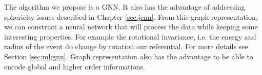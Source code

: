\documentclass[../main.tex]{subfiles}
\begin{document}
The algorithm we propose is a GNN. It also has the advantage of addressing sphericity issues described in Chapter \ref{sec:jcnn}.
From this graph representation, we can construct a neural network that will process the data while keeping some interesting properties. For example the rotational invariance, i.e. the energy and radius of the event do change by rotation our referential. For more details see Section \ref{sec:ml:gnn}. Graph representation also has the advantage to be able to encode global and higher order informations.

%
\end{document}
